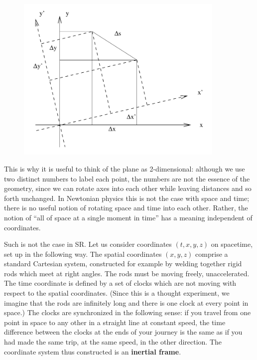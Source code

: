 \documentclass[12pt]{article}
\begin{document}
\begin{figure}[h]
  \centerline{
  \includegraphics[height=8cm]{pdf/one2}}
\end{figure}

This is why it is useful to think of the plane as 2-dimensional: although
we use two distinct numbers to label each point, the numbers are not the
essence of the geometry, since we can rotate axes into each other while
leaving distances and so forth unchanged.  In Newtonian physics this is
not the case with space and time; there is no useful notion of rotating
space and time into each other.  Rather, the notion of ``all of space at
a single moment in time'' has a meaning independent of coordinates.

Such is not the case in SR.  Let us consider coordinates $(t,x,y,z)$ on
spacetime, set up in the following way.  The spatial coordinates $(x,y,z)$
comprise a standard Cartesian system, constructed for example by welding
together rigid rods which meet at right angles.  The rods must be moving
freely, unaccelerated.  The time coordinate is
defined by a set of clocks which are not moving with respect to the
spatial coordinates.  (Since this is a thought experiment, we imagine that
the rods are infinitely long and there is one clock at every point in space.)
The clocks are synchronized in the following sense: if you travel from one
point in space to any other in a straight line at constant speed, the time
difference between the clocks at the ends of your journey is the same as
if you had made the same trip, at the same speed, in the other direction.
The coordinate system thus constructed is an {\bf inertial frame}.
\end{document}
